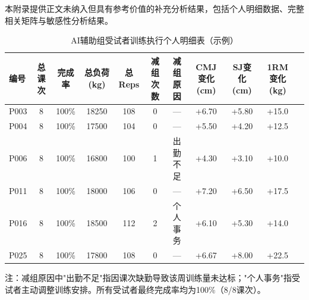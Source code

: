 本附录提供正文未纳入但具有参考价值的补充分析结果，包括个人明细数据、完整相关矩阵与敏感性分析结果。

\begin{table}[htbp]
\centering
\caption{AI辅助组受试者训练执行个人明细表（示例）}
\label{tab:app_individual}
\begin{threeparttable}
\scriptsize
\begin{tabular}{lcccccccccc}
\toprule
编号 & 总课次 & 完成率 & 总负荷(kg) & 总Reps & 减组次数 & 减组原因 & CMJ变化(cm) & SJ变化(cm) & 1RM变化(kg) \\
\midrule
P003 & 8 & 100\% & 18250 & 108 & 0 & --- & +6.70 & +5.80 & +15.0 \\
P004 & 8 & 100\% & 17500 & 104 & 0 & --- & +5.50 & +4.20 & +12.5 \\
P006 & 8 & 100\% & 16800 & 100 & 1 & 出勤不足 & +4.30 & +3.10 & +10.0 \\
P011 & 8 & 100\% & 18000 & 106 & 0 & --- & +7.20 & +6.50 & +17.5 \\
P016 & 8 & 100\% & 18500 & 112 & 2 & 个人事务 & +6.10 & +5.30 & +14.0 \\
P025 & 8 & 100\% & 17800 & 108 & 0 & --- & +6.67 & +8.00 & +22.5 \\
\bottomrule
\end{tabular}
\begin{tablenotes}[flushleft]\footnotesize
\item 注：减组原因中"出勤不足"指因课次缺勤导致该周训练量未达标；"个人事务"指受试者主动调整训练安排。所有受试者最终完成率均为100\%（8/8课次）。
\end{tablenotes}
\end{threeparttable}
\end{table}


